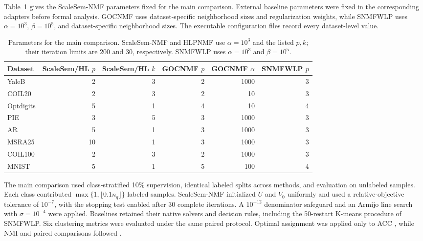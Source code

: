 \documentclass[a4paper,preprint,12pt]{elsarticle}
\newcommand{\PRtablefont}{\fontsize{10}{12}\selectfont}
\theoremstyle{remark}
\begin{document}
Table~\ref{tab:scalesem_parameters} gives the ScaleSem-NMF parameters fixed for the main comparison. External baseline parameters were fixed in the corresponding adapters before formal analysis. GOCNMF uses dataset-specific neighborhood sizes and regularization weights, while SNMFWLP uses \(\alpha=10^3\), \(\beta=10^5\), and dataset-specific neighborhood sizes. The executable configuration files record every dataset-level value.

\begin{table}[!htbp]
\centering
\caption{Parameters for the main comparison. ScaleSem-NMF and HLPNMF use \(\alpha=10^3\) and the listed \(p,k\); their iteration limits are 200 and 30, respectively. SNMFWLP uses \(\alpha=10^3\) and \(\beta=10^5\).}
\label{tab:scalesem_parameters}
\PRtablefont
\setlength{\tabcolsep}{3pt}
\begin{tabular}{lrrrrr}
\toprule
Dataset & ScaleSem/HL \(p\) & ScaleSem/HL \(k\) & GOCNMF \(p\) & GOCNMF \(\alpha\) & SNMFWLP \(p\) \\
\midrule
YaleB     & 2  & 3 & 2 & 1000 & 3 \\
COIL20    & 2  & 3 & 2 & 10   & 3 \\
Optdigits & 5  & 1 & 4 & 10   & 4 \\
PIE       & 3  & 5 & 3 & 1000 & 3 \\
AR        & 5  & 1 & 3 & 1000 & 3 \\
MSRA25    & 10 & 1 & 3 & 1000 & 3 \\
COIL100   & 2  & 3 & 2 & 1000 & 3 \\
MNIST     & 5  & 1 & 5 & 100  & 4 \\
\bottomrule
\end{tabular}
\end{table}

The main comparison used class-stratified 10\% supervision, identical labeled splits across methods, and evaluation on unlabeled samples. Each class contributed \(\max\{1,\lfloor0.1n_q\rfloor\}\) labeled samples. ScaleSem-NMF initialized \(U\) and \(V_0\) uniformly and used a relative-objective tolerance of \(10^{-7}\), with the stopping test enabled after 30 complete iterations. A \(10^{-12}\) denominator safeguard and an Armijo line search with \(\sigma=10^{-4}\) were applied. Baselines retained their native solvers and decision rules, including the 50-restart K-means procedure of SNMFWLP. Six clustering metrics were evaluated under the same paired protocol. Optimal assignment was applied only to ACC \cite{Kuhn1955Hungarian}, while NMI and paired comparisons followed \cite{Vinh2010NMI,Wilcoxon1945}.
\end{document}
